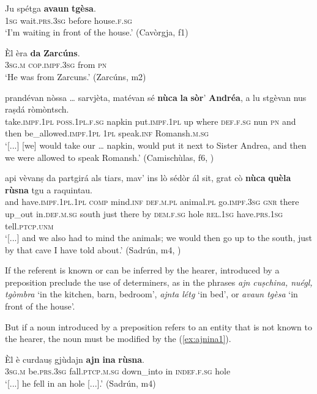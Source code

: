 \ea
\label{ex:avaun1}
\gll Ju spétga \textbf{avaun} \textbf{tgèsa}.\\
\textsc{1sg} wait\textsc{.prs.3sg} before house.\textsc{f.sg}\\
\glt `I'm waiting in front of the house.' (Cavòrgja, f1)
\z

\ea
\label{ex:da1}
\gll Èl èra \textbf{da} \textbf{Zarcúns}.\\
\textsc{3sg.m} \textsc{cop.impf.3sg} from \textsc{pn}\\
\glt `He was from Zarcuns.' (Zarcúns, m2)
\z


\ea
\label{ex:nuca1}
\gll [...] prandévan nòssa … sarvjèta, matévan sé \textbf{nùca} \textbf{la} \textbf{sòr}’ \textbf{Andréa}, a lu stgèvan nus raṣdá ròmòntsch.\\
{} take.\textsc{impf.1pl} \textsc{poss.1pl.f.sg} {} napkin put.\textsc{impf.1pl} up  where \textsc{def.f.sg} nun \textsc{pn} and then be\_allowed.\textsc{impf.1pl} \textsc{1pl} speak.\textsc{inf} Romansh.\textsc{m.sg}\\
\glt `[...] [we] would take our … napkin, would put it next to Sister Andrea, and then we were allowed to speak Romansh.' (Camischùlas, f6, )
\z

\ea
\label{ex:nuca2}
\gll [...] api vèvanṣ da partgirá als tiars, mav’ ins lò sédòr ál sit, grat cò \textbf{nùca} \textbf{quèla} \textbf{rùsna} tgu a raquintau.\\
{} and have.\textsc{impf.1pl.1pl} \textsc{comp} mind.\textsc{inf} \textsc{def.m.pl} animal.\textsc{pl} go.\textsc{impf.3sg} \textsc{gnr} there up\_out in.\textsc{def.m.sg} south just there by \textsc{dem.f.sg} hole \textsc{rel.1sg} have.\textsc{prs.1sg} tell.\textsc{ptcp.unm}\\  
\glt `[...] and we also had to mind the animals; we would then go up to the south, just by that cave I have told about.' (Sadrún, m4, )
\z

If the referent is known or can be inferred by the hearer,  introduced by a preposition preclude the use of determiners, as in the phrases \textit{ajn cuṣchina, nuégl, tgòmbra} `in the kitchen, barn, bedroom', \textit{ajnta létg} `in bed', or \textit{avaun tgèsa} `in front of the house'.

But if a noun introduced by a preposition refers to an entity that is not known to the hearer, the noun must be modified by the  (\ref{ex:ajnina1}).

\ea
\label{ex:ajnina1}
\gll  Èl è curdauṣ gjùdajn \textbf{ajn} \textbf{ina} \textbf{rùsna}.\\
\textsc{3sg.m} be.\textsc{prs.3sg} fall.\textsc{ptcp.m.sg} down\_into in \textsc{indef.f.sg} hole\\
\glt `[...] he fell in an hole [...].' (Sadrún, m4)
\z

